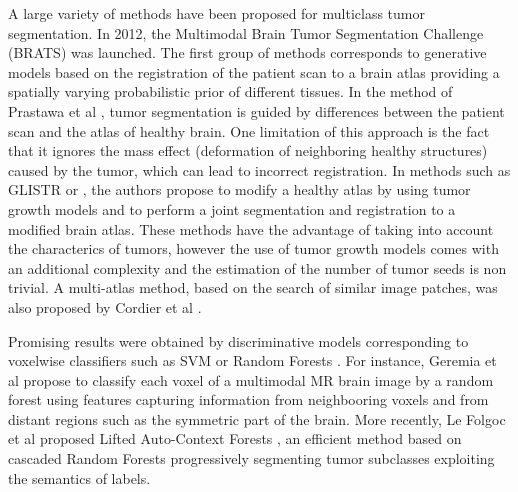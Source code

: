 \documentclass[preprint,12pt]{elsarticle}
\begin{document}
A large variety of methods have been proposed for multiclass tumor segmentation. In 2012, the Multimodal Brain Tumor Segmentation Challenge (BRATS) \cite{menze2015multimodal,bakas2017advancing} was launched. The first group of methods corresponds to generative models based on the registration of the patient scan to a brain atlas providing a spatially varying probabilistic prior of different tissues. In the method of Prastawa et al \cite{prastawa2004brain}, tumor segmentation is guided by differences between the patient scan and the atlas of healthy brain. One limitation of this approach is the fact that it ignores the mass effect (deformation of neighboring healthy structures) caused by the tumor, which can lead to incorrect registration. In methods such as GLISTR \cite{gooya2012glistr} or \cite{kwon2014combining}, the authors propose to modify a healthy atlas by using tumor growth models and to perform a joint segmentation and registration to a modified brain atlas. These methods have the advantage of taking into account the characterics of tumors, however the use of tumor growth models comes with an additional complexity and the estimation of the number of tumor seeds is non trivial. A multi-atlas method, based on the search of similar image patches, was also proposed by Cordier et al \cite{cordier2016patch}.


Promising results were obtained by discriminative models corresponding to voxelwise classifiers such as SVM \cite{bauer2011fully,lee2005segmenting} or Random Forests \cite{ho1995random, zikic2012decision, geremia2012spatial, le2016lifted,bauer2012segmentation,tustison2015optimal}. For instance, Geremia et al  \cite{geremia2012spatial} propose to classify each voxel of a multimodal MR brain image by a random forest using features capturing information from neighbooring voxels and from distant regions such as the symmetric part of the brain. More recently, Le Folgoc et al proposed Lifted Auto-Context Forests \cite{le2016lifted}, an efficient method based on cascaded Random Forests progressively segmenting tumor subclasses exploiting the semantics of labels. 
\end{document}
